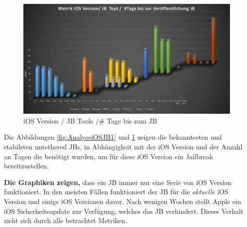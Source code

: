 \begin{figure}[hp!]
        \centering
                \includegraphics[scale=0.35]{Bilder/Frage1_2.png}
        \caption{iOS Version / JB Tools /\# Tage bis zum JB}
        \label{fig:AnalyseiOSJB2}
\end{figure}

Die Abbildungen \ref{fig:AnalyseiOSJB1} und \ref{fig:AnalyseiOSJB2} zeigen die bekanntesten und stabilsten untethered JBs, in Abhängigkeit mit der iOS Version und der Anzahl an Tagen die benötigt wurden, um für diese iOS Version ein Jailbreak bereitzustellen. \par 
\textbf{Die Graphiken zeigen,} dass ein JB immer nur eine Serie von iOS Version funktioniert. In den meisten Fällen funktioniert der JB für die \textit{\glqq aktuelle\grqq{}} iOS Version und einige iOS Versionen davor. Nach wenigen Wochen stellt Apple ein iOS Sicherheitsupdate zur Verfügung, welches das JB verhindert. Dieses Verhalt zieht sich durch alle betrachtet Metriken.  
%



